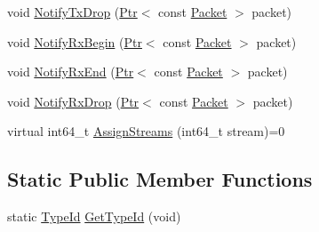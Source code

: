 \begin{DoxyCompactItemize}
\item 
void \hyperlink{classns3_1_1UanPhy_a4235f871ccbf21f605dd9d9791a7e58b}{Notify\+Tx\+Drop} (\hyperlink{classns3_1_1Ptr}{Ptr}$<$ const \hyperlink{classns3_1_1Packet}{Packet} $>$ packet)
\item 
void \hyperlink{classns3_1_1UanPhy_adca2b9b5d2992deb991ec88a7a9281a9}{Notify\+Rx\+Begin} (\hyperlink{classns3_1_1Ptr}{Ptr}$<$ const \hyperlink{classns3_1_1Packet}{Packet} $>$ packet)
\item 
void \hyperlink{classns3_1_1UanPhy_ae7f5e61de1495040fe668a55185a75db}{Notify\+Rx\+End} (\hyperlink{classns3_1_1Ptr}{Ptr}$<$ const \hyperlink{classns3_1_1Packet}{Packet} $>$ packet)
\item 
void \hyperlink{classns3_1_1UanPhy_a5bb13228bb14707309af61666412968e}{Notify\+Rx\+Drop} (\hyperlink{classns3_1_1Ptr}{Ptr}$<$ const \hyperlink{classns3_1_1Packet}{Packet} $>$ packet)
\item 
virtual int64\+\_\+t \hyperlink{classns3_1_1UanPhy_ae381194b692211f6dca76c7655b6cc3a}{Assign\+Streams} (int64\+\_\+t stream)=0
\end{DoxyCompactItemize}
\subsection*{Static Public Member Functions}
\begin{DoxyCompactItemize}
\item 
static \hyperlink{classns3_1_1TypeId}{Type\+Id} \hyperlink{classns3_1_1UanPhy_a9a9feb225f7c24d41b0ee06d1f55275f}{Get\+Type\+Id} (void)
\end{DoxyCompactItemize}
